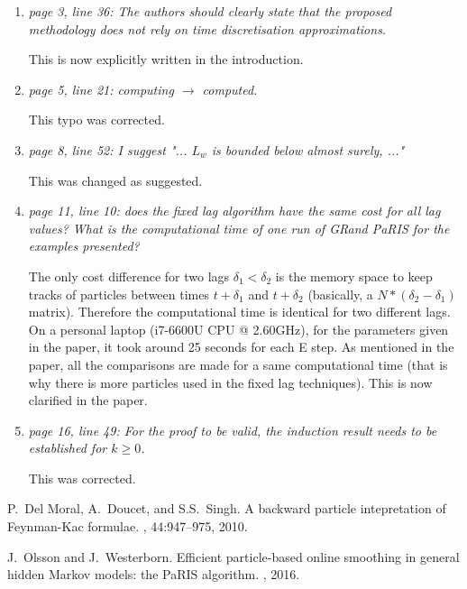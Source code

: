 \documentclass[12pt]{article}
\newcommand{\1}{\mathrm{1}}
\begin{document}
\begin{enumerate}
\item{\em page 3, line 36: The authors should clearly state that the proposed methodology
does not rely on time discretisation approximations.}

\vspace{.3cm}

This is now explicitly written in the introduction.

\item{\em page 5, line 21: computing $\longrightarrow$ computed.}

\vspace{.3cm}

This typo was corrected.

\item {\em page 8, line 52: I suggest "... $L_w$ is bounded below almost surely, ..."}

\vspace{.3cm}

This was changed as suggested.

\item {\em page 11, line 10: does the fixed lag algorithm have the same cost for all lag values?
What is the computational time of one run of GRand PaRIS for the examples presented?}

\vspace{.3cm}

The only cost difference for two lags $\delta_1 < \delta_2$ is the memory space to keep tracks of particles between times $t+\delta_1$ and $t+\delta_2$ (basically, a $N*(\delta_2 - \delta_1)$ matrix). Therefore the computational time is identical for two different lags. On a personal laptop  (i7-6600U CPU @ 2.60GHz), for the parameters given in the paper, it took around 25 seconds for each E step. As mentioned in the paper, all the comparisons are made for a same computational time (that is why there is more particles used in the fixed lag techniques). 
This is now clarified in the paper.

\item {\em page 16, line 49: For the proof to be valid, the induction result needs to be established for $k\ge 0$.}

\vspace{.3cm}

This was corrected.

\end{enumerate}


\begin{thebibliography}{10}

P.~{D}el {M}oral, {A}.~{D}oucet, and {S}.{S}.~{S}ingh.
\newblock A backward particle intepretation of {F}eynman-{K}ac formulae.
, 44:947--975, 2010.

J.~Olsson and J.~Westerborn.
\newblock Efficient particle-based online smoothing in general hidden {M}arkov
  models: the {PaRIS} algorithm.
, 2016.


\end{thebibliography}
\end{document}
